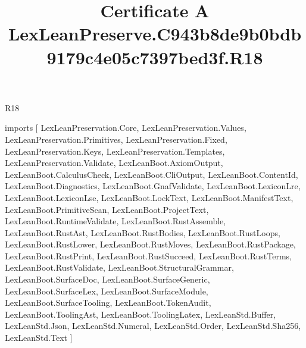 \begin{lexlean}{R18}
\title{Certificate A LexLeanPreserve.C943b8de9b0bdb9179c4e05c7397bed3f.R18}
\begin{coremodule}
imports [
  LexLeanPreservation.Core,
  LexLeanPreservation.Values,
  LexLeanPreservation.Primitives,
  LexLeanPreservation.Fixed,
  LexLeanPreservation.Keys,
  LexLeanPreservation.Templates,
  LexLeanPreservation.Validate,
  LexLeanBoot.AxiomOutput,
  LexLeanBoot.CalculusCheck,
  LexLeanBoot.CliOutput,
  LexLeanBoot.ContentId,
  LexLeanBoot.Diagnostics,
  LexLeanBoot.GnafValidate,
  LexLeanBoot.LexiconLre,
  LexLeanBoot.LexiconLse,
  LexLeanBoot.LockText,
  LexLeanBoot.ManifestText,
  LexLeanBoot.PrimitiveScan,
  LexLeanBoot.ProjectText,
  LexLeanBoot.RuntimeValidate,
  LexLeanBoot.RustAssemble,
  LexLeanBoot.RustAst,
  LexLeanBoot.RustBodies,
  LexLeanBoot.RustLoops,
  LexLeanBoot.RustLower,
  LexLeanBoot.RustMoves,
  LexLeanBoot.RustPackage,
  LexLeanBoot.RustPrint,
  LexLeanBoot.RustSucceed,
  LexLeanBoot.RustTerms,
  LexLeanBoot.RustValidate,
  LexLeanBoot.StructuralGrammar,
  LexLeanBoot.SurfaceDoc,
  LexLeanBoot.SurfaceGeneric,
  LexLeanBoot.SurfaceLex,
  LexLeanBoot.SurfaceModule,
  LexLeanBoot.SurfaceTooling,
  LexLeanBoot.TokenAudit,
  LexLeanBoot.ToolingAst,
  LexLeanBoot.ToolingLatex,
  LexLeanStd.Buffer,
  LexLeanStd.Json,
  LexLeanStd.Numeral,
  LexLeanStd.Order,
  LexLeanStd.Sha256,
  LexLeanStd.Text
]


\end{coremodule}
\end{lexlean}
